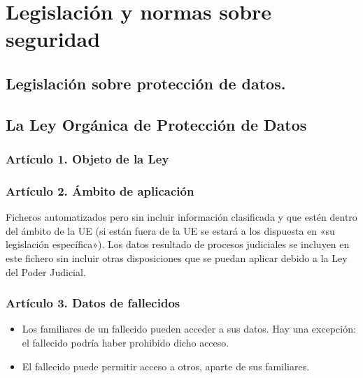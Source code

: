 \documentclass[letterpaper,10pt,spanish]{sphinxmanual}
\begin{document}
\chapter{Legislación y normas sobre seguridad}
\label{\detokenize{tema_lopd/tema_lopd:legislacion-y-normas-sobre-seguridad}}\label{\detokenize{tema_lopd/tema_lopd::doc}}

\section{Legislación sobre protección de datos.}
\label{\detokenize{tema_lopd/tema_lopd:legislacion-sobre-proteccion-de-datos}}

\section{La Ley Orgánica de Protección de Datos}
\label{\detokenize{tema_lopd/tema_lopd:la-ley-organica-de-proteccion-de-datos}}

\subsection{Artículo 1. Objeto de la Ley}
\label{\detokenize{tema_lopd/tema_lopd:articulo-1-objeto-de-la-ley}}

\subsection{Artículo 2. Ámbito de aplicación}
\label{\detokenize{tema_lopd/tema_lopd:articulo-2-ambito-de-aplicacion}}
Ficheros automatizados pero sin incluir información clasificada y que estén dentro del ámbito de la UE (si están fuera de la UE se estará a los dispuesta en «su legislación específica»). Los datos resultado de procesos judiciales se incluyen en este fichero sin incluir otras disposiciones que se puedan aplicar debido a la Ley del Poder Judicial.


\subsection{Artículo 3. Datos de fallecidos}
\label{\detokenize{tema_lopd/tema_lopd:articulo-3-datos-de-fallecidos}}\begin{itemize}
\item {} 
Los familiares de un fallecido pueden acceder a sus datos. Hay una excepción: el fallecido podría haber prohibido dicho acceso.

\item {} 
El fallecido puede permitir acceso a otros, aparte de sus familiares.

\end{itemize}
\end{document}
